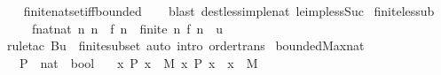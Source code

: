 \begin{isabellebody}
%
\isadelimproof
\ \ %
\endisadelimproof
%
\isatagproof
{}\isamarkupfalse%
\ finite{\isacharunderscore}{\kern0pt}nat{\isacharunderscore}{\kern0pt}set{\isacharunderscore}{\kern0pt}iff{\isacharunderscore}{\kern0pt}bounded\isanewline
\ \ \isamarkupfalse%
\ {\isacharparenleft}{\kern0pt}blast\ dest{\isacharcolon}{\kern0pt}less{\isacharunderscore}{\kern0pt}imp{\isacharunderscore}{\kern0pt}le{\isacharunderscore}{\kern0pt}nat\ le{\isacharunderscore}{\kern0pt}imp{\isacharunderscore}{\kern0pt}less{\isacharunderscore}{\kern0pt}Suc{\isacharparenright}{\kern0pt}%
\endisatagproof
{\isafoldproof}%
%
\isadelimproof
\isanewline
%
\endisadelimproof
\isanewline
{}\isamarkupfalse%
\ finite{\isacharunderscore}{\kern0pt}less{\isacharunderscore}{\kern0pt}ub{\isacharcolon}{\kern0pt}\isanewline
\ \ \ \ \ {\isachardoublequoteopen}{\isacharbang}{\kern0pt}{\isacharbang}{\kern0pt}f{\isacharcolon}{\kern0pt}{\isacharcolon}{\kern0pt}nat{\isacharequal}{\kern0pt}{\isachargreater}{\kern0pt}nat{\isachardot}{\kern0pt}\ {\isacharparenleft}{\kern0pt}{\isacharbang}{\kern0pt}{\isacharbang}{\kern0pt}n{\isachardot}{\kern0pt}\ n\ {\isasymle}\ f\ n{\isacharparenright}{\kern0pt}\ {\isacharequal}{\kern0pt}{\isacharequal}{\kern0pt}{\isachargreater}{\kern0pt}\ finite\ {\isacharbraceleft}{\kern0pt}n{\isachardot}{\kern0pt}\ f\ n\ {\isasymle}\ u{\isacharbraceright}{\kern0pt}{\isachardoublequoteclose}\isanewline
%
\isadelimproof
%
\endisadelimproof
%
\isatagproof
{}\isamarkupfalse%
\ {\isacharparenleft}{\kern0pt}rule{\isacharunderscore}{\kern0pt}tac\ B{\isacharequal}{\kern0pt}{\isachardoublequoteopen}{\isacharbraceleft}{\kern0pt}{\isachardot}{\kern0pt}{\isachardot}{\kern0pt}u{\isacharbraceright}{\kern0pt}{\isachardoublequoteclose}\ \ finite{\isacharunderscore}{\kern0pt}subset{\isacharcomma}{\kern0pt}\ auto\ intro{\isacharcolon}{\kern0pt}\ order{\isacharunderscore}{\kern0pt}trans{\isacharparenright}{\kern0pt}%
\endisatagproof
{\isafoldproof}%
%
\isadelimproof
\isanewline
%
\endisadelimproof
\isanewline
{}\isamarkupfalse%
\ bounded{\isacharunderscore}{\kern0pt}Max{\isacharunderscore}{\kern0pt}nat{\isacharcolon}{\kern0pt}\isanewline
\ \ \ P\ {\isacharcolon}{\kern0pt}{\isacharcolon}{\kern0pt}\ {\isachardoublequoteopen}nat\ {\isasymRightarrow}\ bool{\isachardoublequoteclose}\isanewline
\ \ \ x{\isacharcolon}{\kern0pt}\ {\isachardoublequoteopen}P\ x{\isachardoublequoteclose}\ \ M{\isacharcolon}{\kern0pt}\ {\isachardoublequoteopen}{\isasymAnd}x{\isachardot}{\kern0pt}\ P\ x\ {\isasymLongrightarrow}\ x\ {\isasymle}\ M{\isachardoublequoteclose}\isanewline

\end{isabellebody}
